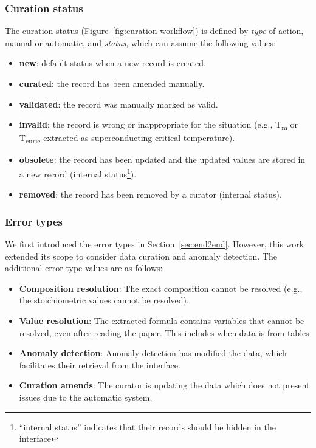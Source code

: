 \subsubsection{Curation status} 
\label{subsec:curation-status}
The curation status (Figure~\ref{fig:curation-workflow}) is defined by \emph{type} of action, manual or automatic, and \emph{status}, which can assume the following values: 
\begin{itemize}
    \item \textbf{new}: default status when a new record is created.
    \item \textbf{curated}: the record has been amended manually.
    \item \textbf{validated}: the record was manually marked as valid.
    \item \textbf{invalid}: the record is wrong or inappropriate for the situation (e.g., T\textsubscript{m} or T\textsubscript{curie} extracted as superconducting critical temperature).
    \item \textbf{obsolete}: the record has been updated and the updated values are stored in a new record (internal status\footnote{``internal status'' indicates that their records should be hidden in the interface}).
    \item \textbf{removed}: the record has been removed by a curator (internal status).
\end{itemize} 
    

\subsubsection{Error types}
\label{subsec:error-types}
We first introduced the error types in Section~\ref{sec:end2end}. However, this work extended its scope to consider data curation and anomaly detection. 
The additional error type values are as follows: 

\begin{itemize}
    \item \textbf{Composition resolution}: The exact composition cannot be resolved (e.g., the stoichiometric values cannot be resolved).
    \item \textbf{Value resolution}: The extracted formula contains variables that cannot be resolved, even after reading the paper. This includes when data is from tables
    \item \textbf{Anomaly detection}: Anomaly detection has modified the data, which facilitates their retrieval from the interface.
    \item \textbf{Curation amends}: The curator is updating the data which does not present issues due to the automatic system.
\end{itemize}


